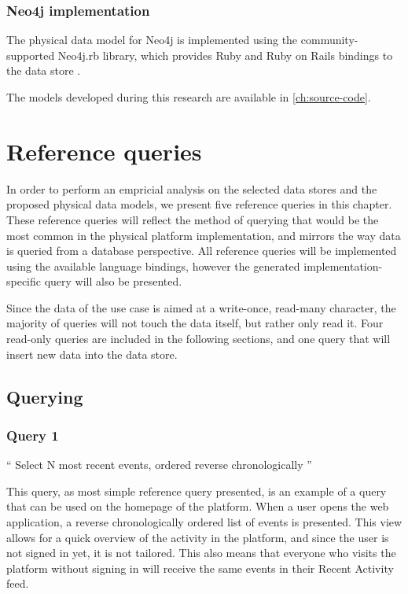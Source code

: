\subsubsection{Neo4j implementation}
\label{subsubsec:neo4j-implementation}

The physical data model for Neo4j is implemented using the community-supported Neo4j.rb library, which provides Ruby and Ruby on Rails bindings to the data store \autocite{Neo4jrb2010}.

The models developed during this research are available in \cref{ch:source-code}.

\section{Reference queries}
\label{sec:reference-queries}

In order to perform an empricial analysis on the selected data stores and the proposed physical data models, we present five reference queries in this chapter.
These reference queries will reflect the method of querying that would be the most common in the physical platform implementation, and mirrors the way data is queried from a database perspective.
All reference queries will be implemented using the available language bindings, however the generated implementation-specific query will also be presented.

Since the data of the use case is aimed at a write-once, read-many character, the majority of queries will not touch the data itself, but rather only read it.
Four read-only queries are included in the following sections, and one query that will insert new data into the data store.

\subsection{Querying}
\label{subsec:querying}

\subsubsection{Query 1}
\label{subsubsec:query-1}

``
Select N most recent events, ordered reverse chronologically
''

This query, as most simple reference query presented, is an example of a query that can be used on the homepage of the platform.
When a user opens the web application, a reverse chronologically ordered list of events is presented.
This view allows for a quick overview of the activity in the platform, and since the user is not signed in yet, it is not tailored.
This also means that everyone who visits the platform without signing in will receive the same events in their Recent Activity feed.

